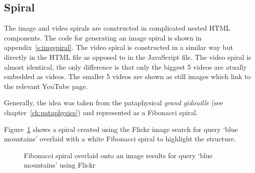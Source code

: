 \subsection{Spiral}
\label{s:spiral}

The image and video spirals are constructed in complicated nested \ac{HTML} components. The code for generating an image spiral is shown in appendix~\ref{s:imgspiral}. The video spiral is constructed in a similar way but directly in the \ac{HTML} file as opposed to in the JavaScript file. The video spiral is almost identical, the only difference is that only the biggest 5 videos are atually embedded as videos. The smaller 5 videos are shown as still images which link to the relevant YouTube page.

Generally, the idea was taken from the pataphysical \emph{grand gidouille} (see chap\-ter~\ref{ch:pataphysics}) and represented as a Fibonacci spiral. 

Figure~\ref{img:fibspiral} shows a spiral created using the Flickr image search for query `blue mountains' overlaid with a white Fibonacci spiral to highlight the structure.

\begin{figure}[!htbp] %
  \centering
  \caption[Fibonacci image spiral]{Fibonacci spiral overlaid onto an image results for query `blue mountains' using Flickr}
  \label{img:fibspiral}
\end{figure}


